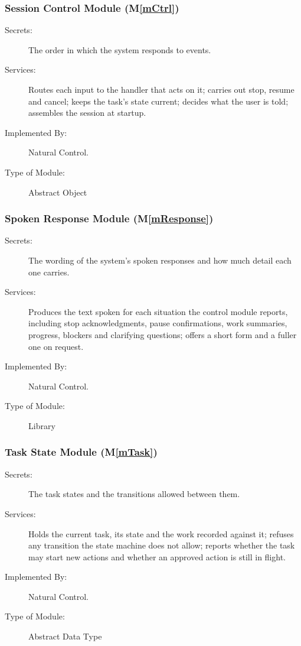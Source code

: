 \documentclass[12pt, titlepage]{article}
\newcommand{\progname}{Natural Control}
\newcommand{\mref}[1]{M\ref{#1}}
\begin{document}
\subsubsection{Session Control Module (\mref{mCtrl})}
\begin{description}
\item[Secrets:] The order in which the system responds to events.
\item[Services:] Routes each input to the handler that acts on it; carries out
stop, resume and cancel; keeps the task's state current; decides what the user
is told; assembles the session at startup.
\item[Implemented By:] \progname{}.
\item[Type of Module:] Abstract Object
\end{description}

\subsubsection{Spoken Response Module (\mref{mResponse})}
\begin{description}
\item[Secrets:] The wording of the system's spoken responses and how much
detail each one carries.
\item[Services:] Produces the text spoken for each situation the control
module reports, including stop acknowledgments, pause confirmations, work
summaries, progress, blockers and clarifying questions; offers a short form
and a fuller one on request.
\item[Implemented By:] \progname{}.
\item[Type of Module:] Library
\end{description}

\subsubsection{Task State Module (\mref{mTask})}
\begin{description}
\item[Secrets:] The task states and the transitions allowed between them.
\item[Services:] Holds the current task, its state and the work recorded
against it; refuses any transition the state machine does not allow; reports
whether the task may start new actions and whether an approved action is still
in flight.
\item[Implemented By:] \progname{}.
\item[Type of Module:] Abstract Data Type
\end{description}
\end{document}
